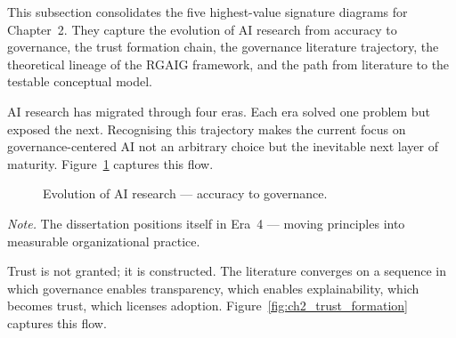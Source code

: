 \noindent This subsection consolidates the five highest-value signature diagrams for Chapter~2. They capture the evolution of AI research from accuracy to governance, the trust formation chain, the governance literature trajectory, the theoretical lineage of the RGAIG framework, and the path from literature to the testable conceptual model.


\noindent AI research has migrated through four eras. Each era solved one problem but exposed the next. Recognising this trajectory makes the current focus on governance-centered AI not an arbitrary choice but the inevitable next layer of maturity. Figure~\ref{fig:ch2_ai_research_evolution} captures this flow.

\begin{figure}[!htbp]
\centering
{}
\caption[Evolution of AI research --- accuracy to governance]{Evolution of AI research --- accuracy to governance.}
\label{fig:ch2_ai_research_evolution}
\end{figure}

\vspace{0.3em}\noindent\textit{Note.} The dissertation positions itself in Era~4 --- moving principles into measurable organizational practice.



\noindent Trust is not granted; it is constructed. The literature converges on a sequence in which governance enables transparency, which enables explainability, which becomes trust, which licenses adoption. Figure~\ref{fig:ch2_trust_formation} captures this flow.

